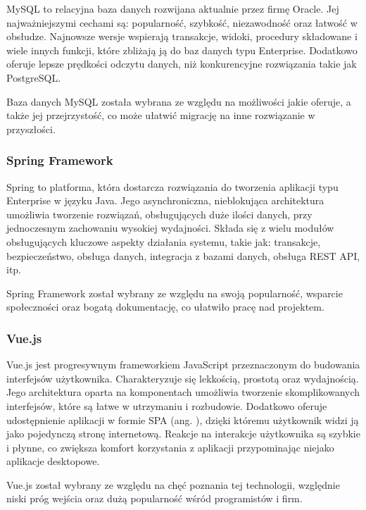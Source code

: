 MySQL to relacyjna baza danych rozwijana aktualnie przez firmę Oracle.
Jej najważniejszymi cechami są: popularność, szybkość, niezawodność oraz łatwość w obsłudze.
Najnowsze wersje wspierają transakcje, widoki, procedury składowane i wiele innych funkcji, które zbliżają ją do baz danych typu Enterprise.
Dodatkowo oferuje lepsze prędkości odczytu danych, niż konkurencyjne rozwiązania takie jak PostgreSQL. \cite{bib:mysql}

Baza danych MySQL została wybrana ze względu na możliwości jakie oferuje, a także jej przejrzystość, co może ułatwić migrację na inne rozwiązanie w przyszłości.

\subsubsection*{Spring Framework}

Spring to platforma, która dostarcza rozwiązania do tworzenia aplikacji typu Enterprise w języku Java.
Jego asynchroniczna, nieblokująca architektura umożliwia tworzenie rozwiązań, obsługujących duże ilości danych, przy jednoczesnym zachowaniu wysokiej wydajności.
Składa się z wielu modułów obsługujących kluczowe aspekty działania systemu, takie jak: transakcje, bezpieczeństwo, obsługa danych, integracja z bazami danych, obsługa REST API, itp. \cite{bib:spring}

Spring Framework został wybrany ze względu na swoją popularność, wsparcie społeczności oraz bogatą dokumentację, co ułatwiło pracę nad projektem.

\subsubsection*{Vue.js}

Vue.js jest progresywnym frameworkiem JavaScript przeznaczonym do budowania interfejsów użytkownika. Charakteryzuje się lekkością, prostotą oraz wydajnością. Jego architektura oparta na komponentach umożliwia tworzenie skomplikowanych interfejsów, które są łatwe w utrzymaniu i rozbudowie. Dodatkowo oferuje udostępnienie aplikacji w formie SPA (ang. ), dzięki któremu użytkownik widzi ją jako pojedynczą stronę internetową. Reakcje na interakcje użytkownika są szybkie i płynne, co zwiększa komfort korzystania z aplikacji przypominając niejako aplikacje desktopowe. \cite{bib:vuejs}

Vue.js został wybrany ze względu na chęć poznania tej technologii, względnie niski próg wejścia oraz dużą popularność wśród programistów i firm.

